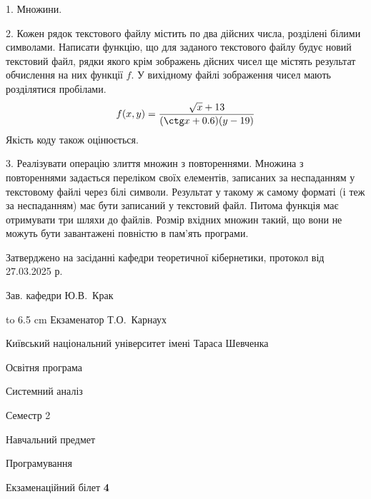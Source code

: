 \documentclass[12pt, ukrainian]{article}
\begin{document}
{%
1. Множини.%
\par
\vspace{2mm}

2. Кожен рядок текстового файлу містить по два дійсних числа, розділені білими символами.
Написати функцію, що для заданого текстового файлу будує новий текстовий файл, рядки якого крім зображень дйсних чисел ще містять результат обчислення на них функції $f$. У вихідному файлі зображення чисел мають розділятися пробілами. 
$$f(x, y) =\frac{\sqrt x + 13}{(\ctg x + 0.6) (y - 19)}$$ 
Якість коду також оцінюється.

\par
\vspace{2mm}

3. Реалізувати операцію злиття множин з повтореннями. Множина з повтореннями задається переліком своїх елементів, записаних за неспаданням у текстовому файлі через білі символи. Результат у такому ж самому форматі (і теж за неспаданням) має бути записаний у текстовий файл. Питома функція має отримувати три шляхи до файлів. Розмір вхідних множин такий, що вони не можуть бути завантажені повністю в пам’ять програми.

}
{\smallskip\smallskip \begin {scriptsize} Затверджено на засіданні кафедри теоретичної кібернетики, протокол   від   27.03.2025 р.\par\smallskip\smallskip\smallskip\smallskip
{\parbox {6.5 cm} {Зав. кафедри \dotfill Ю.В.~Крак}}\hspace {0.7cm} {\hbox to 6.5 cm { Екзаменатор \dotfill Т.О.~Карнаух}} \end{scriptsize}}
\vspace{2.9cm}
{{\begin {scriptsize}\par
{ \center  Київський національний університет імені Тараса Шевченка \par}
{\parbox {5 cm}{Освітня програма \hfill}{\parbox {7 cm}{Системний аналіз\hfill}}\parbox {6 cm}{\hfill Семестр 2}}\par
{\parbox {5 cm} {Навчальний предмет \hfill}\parbox {7 cm}{Програмування \hfill}\parbox {6cm}{\hfill}\par}\vspace{-15pt} \end{scriptsize}}{\center Екзаменаційний білет \No \textbf { 4 }\par}}
\end{document}
